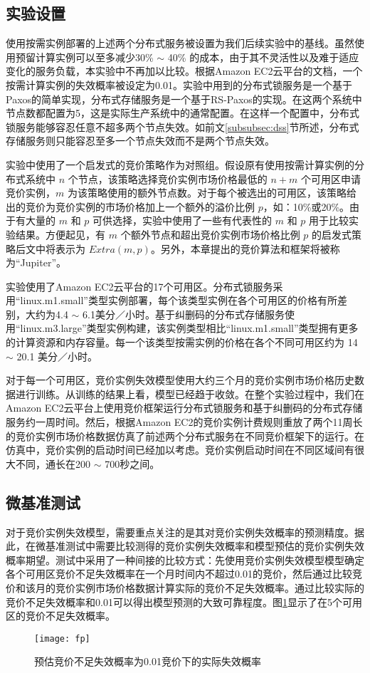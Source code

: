 \subsection{实验设置}
使用按需实例部署的上述两个分布式服务被设置为我们后续实验中的基线。虽然使用预留计算实例可以至多减少30\% $\sim$ 40\% 的成本，由于其不灵活性以及难于适应变化的服务负载，本实验中不再加以比较。根据Amazon EC2云平台的文档\cite{AWS_SLA:2014}，一个按需计算实例的失效概率被设定为0.01。实验中用到的分布式锁服务是一个基于Paxos的简单实现，分布式存储服务是一个基于RS-Paxos的实现\cite{Mu:2014:PME:2600212.2600218}。在这两个系统中节点数都配置为5，这是实际生产系统中的通常配置\cite{Burrows:2006:CLS:1298455.1298487, Mu:2014:PME:2600212.2600218}。在这样一个配置中，分布式锁服务能够容忍任意不超多两个节点失效。如前文\ref{subsubsec:dss}节所述，分布式存储服务则只能容忍至多一个节点失效而不是两个节点失效。

实验中使用了一个启发式的竞价策略作为对照组。假设原有使用按需计算实例的分布式系统中 $n$ 个节点，该策略选择竞价实例市场价格最低的 $n + m$ 个可用区申请竞价实例，$m$ 为该策略使用的额外节点数。对于每个被选出的可用区，该策略给出的竞价为竞价实例的市场价格加上一个额外的溢价比例 $p$，如：10\%或20\%。由于有大量的 $m$ 和 $p$ 可供选择，实验中使用了一些有代表性的 $m$ 和 $p$ 用于比较实验结果。方便起见，有 $m$ 个额外节点和超出竞价实例市场价格比例 $p$ 的启发式策略后文中将表示为 $Extra(m, p)$。另外，本章提出的竞价算法和框架将被称为``Jupiter''。

实验使用了Amazon EC2云平台的17个可用区。分布式锁服务采用``linux.m1.small''类型实例部署，每个该类型实例在各个可用区的价格有所差别，大约为4.4 $\sim$ 6.1美分／小时。基于纠删码的分布式存储服务使用``linux.m3.large''类型实例构建，该实例类型相比``linux.m1.small''类型拥有更多的计算资源和内存容量。每一个该类型按需实例的价格在各个不同可用区约为 14 $\sim$ 20.1 美分／小时。

对于每一个可用区，竞价实例失效模型使用大约三个月的竞价实例市场价格历史数据进行训练。从训练的结果上看，模型已经趋于收敛。在整个实验过程中，我们在Amazon EC2云平台上使用竞价框架运行分布式锁服务和基于纠删码的分布式存储服务约一周时间。然后，根据Amazon EC2的竞价实例计费规则重放了两个11周长的竞价实例市场价格数据仿真了前述两个分布式服务在不同竞价框架下的运行。在仿真中，竞价实例的启动时间已经加以考虑。竞价实例启动时间在不同区域间有很大不同，通长在200 $\sim$ 700秒之间\cite{6253534}。

\subsection{微基准测试}
对于竞价实例失效模型，需要重点关注的是其对竞价实例失效概率的预测精度。据此，在微基准测试中需要比较测得的竞价实例失效概率和模型预估的竞价实例失效概率期望。测试中采用了一种间接的比较方式：先使用竞价实例失效模型模型确定各个可用区竞价不足失效概率在一个月时间内不超过0.01的竞价，然后通过比较竞价和该月的竞价实例市场价格数据计算实际的竞价不足失效概率。通过比较实际的竞价不足失效概率和0.01可以得出模型预测的大致可靠程度。图\ref{figure:fp}显示了在5个可用区的竞价不足失效概率。
\begin{figure}
  \centering
  \texttt{[image: fp]}
  \caption{预估竞价不足失效概率为0.01竞价下的实际失效概率}
  \label{figure:fp}
\end{figure}

